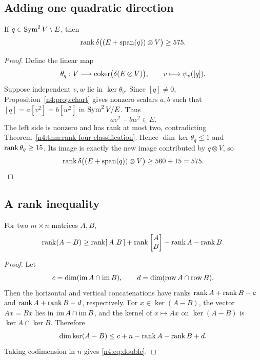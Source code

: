 \subsection{Adding one quadratic direction}\label{n4:sec:extension}

\begin{lemma}\label{n4:lem:extension}
If \(q\in\operatorname{Sym}^2V\setminus E\), then
\[
  \operatorname{rank}\delta\bigl((E+\operatorname{span}(q))\otimes V\bigr)\geq575.
\]
\end{lemma}

\begin{proof}
Define the linear map
\[
  \theta_q:V\longrightarrow
  \operatorname{coker}\bigl(\delta(E\otimes V)\bigr),\qquad
  v\longmapsto\psi_v([q]).
\]
Suppose independent \(v,w\) lie in \(\ker\theta_q\). Since \([q]\neq0\),
Proposition~\ref{n4:prop:chart} gives nonzero scalars \(a,b\) such that
\([q]=a[v^2]=b[w^2]\) in \(\operatorname{Sym}^2V/E\). Thus
\[
  av^2-bw^2\in E.
\]
The left side is nonzero and has rank at most two, contradicting
Theorem~\ref{n4:thm:rank-four-classification}. Hence
\(\dim\ker\theta_q\leq1\) and \(\operatorname{rank}\theta_q\geq15\). Its image is exactly
the new image contributed by \(q\otimes V\), so
\[
  \operatorname{rank}\delta\bigl((E+\operatorname{span}(q))\otimes V\bigr)\geq560+15=575.
\]
\end{proof}

\subsection{A rank inequality}\label{n4:sec:double}

\begin{lemma}\label{n4:lem:double}
For two \(m\times n\) matrices \(A,B\),
\begin{equation}\label{n4:eq:double}
  \operatorname{rank}(A-B)\geq
  \operatorname{rank}[\,A\ B\,]
  +\operatorname{rank}\begin{bmatrix}A\\B\end{bmatrix}
  -\operatorname{rank} A-\operatorname{rank} B.
\end{equation}
\end{lemma}

\begin{proof}
Let
\[
  c=\dim(\operatorname{im} A\cap\operatorname{im} B),\qquad
  d=\dim(\operatorname{row} A\cap\operatorname{row} B).
\]
Then the horizontal and vertical concatenations have ranks
\(\operatorname{rank} A+\operatorname{rank} B-c\) and \(\operatorname{rank} A+\operatorname{rank} B-d\), respectively. For
\(x\in\ker(A-B)\), the vector \(Ax=Bx\) lies in \(\operatorname{im} A\cap\operatorname{im} B\), and
the kernel of \(x\mapsto Ax\) on \(\ker(A-B)\) is
\(\ker A\cap\ker B\). Therefore
\[
  \dim\ker(A-B)\leq c+n-\operatorname{rank} A-\operatorname{rank} B+d.
\]
Taking codimension in \(n\) gives \eqref{n4:eq:double}.
\end{proof}

